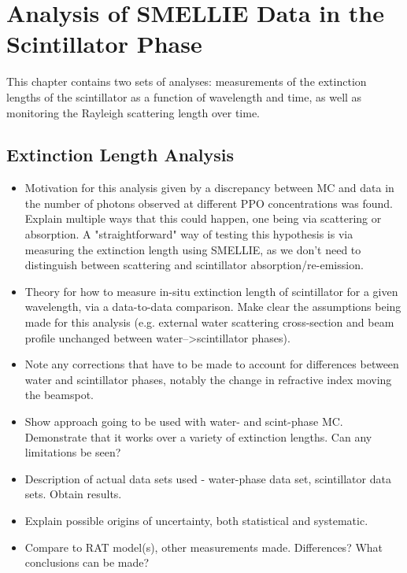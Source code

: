 \chapter{Analysis of SMELLIE Data in the Scintillator Phase}\label{chap:smellie_analysis}
{
    \color{blue}
    This chapter contains two sets of analyses: measurements of the extinction lengths of the scintillator as a function of wavelength and time, as well as monitoring the Rayleigh scattering length over time.

\section{Extinction Length Analysis}
\begin{itemize}
    \item Motivation for this analysis given by a discrepancy between MC and data in the number of photons observed at different PPO concentrations was found. Explain multiple ways that this could happen, one being via scattering or absorption. A "straightforward" way of testing this hypothesis is via measuring the extinction length using SMELLIE, as we don't need to distinguish between scattering and scintillator absorption/re-emission.
    \item Theory for how to measure in-situ extinction length of scintillator for a given wavelength, via a data-to-data comparison. Make clear the assumptions being made for this analysis (e.g. external water scattering cross-section and beam profile unchanged between water-->scintillator phases).
    \item Note any corrections that have to be made to account for differences between water and scintillator phases, notably the change in refractive index moving the beamspot.
    \item Show approach going to be used with water- and scint-phase MC. Demonstrate that it works over a variety of extinction lengths. Can any limitations be seen?
    \item Description of actual data sets used - water-phase data set, scintillator data sets. Obtain results.
    \item Explain possible origins of uncertainty, both statistical and systematic.
    \item Compare to RAT model(s), other measurements made. Differences? What conclusions can be made?
\end{itemize}

}
